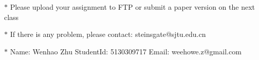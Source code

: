 \documentclass[12pt,a4paper]{article}
\theoremstyle{definition}
\numberwithin{equation}{section}
\numberwithin{figure}{section}
\begin{document}
\noindent

\noindent{}
\begin{center}
\footnotesize{\color{red}$*$ Please upload your assignment to FTP or submit a paper version on the next class}

\footnotesize{\color{red}$*$ If there is any problem, please contact: steinsgate@sjtu.edu.cn}

\footnotesize{\color{blue}$*$ Name: Wenhao Zhu \quad StudentId: 5130309717 \quad Email: weehowe.z@gmail.com}
\end{center}
\end{document}
